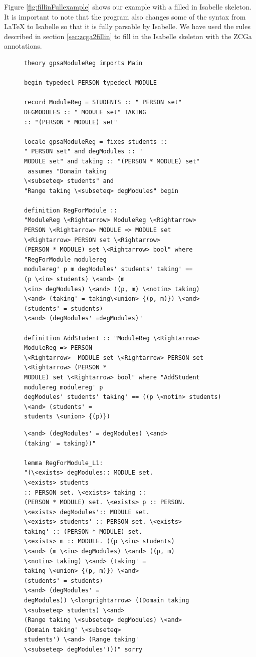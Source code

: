 Figure \ref{fig:fillinFullexample} shows our example with a filled in Isabelle
skeleton. It is important to note that the program also changes some of the
syntax from \LaTeX{} to Isabelle so that it is fully parsable by Isabelle.
We have used the rules described in section \ref{sec:zcga2fillin} to fill in the Isabelle
 skeleton with the ZCGa annotations.

\begin{figure}[H]
\centering
\begin{minipage}{0.45\textwidth}
\centering
\begin{scriptsize}
\begin{BVerbatim}
theory gpsaModuleReg imports Main 

begin typedecl PERSON typedecl MODULE

record ModuleReg = STUDENTS :: " PERSON set"
DEGMODULES :: " MODULE set" TAKING
:: "(PERSON * MODULE) set"

locale gpsaModuleReg = fixes students :: 
" PERSON set" and degModules :: "
MODULE set" and taking :: "(PERSON * MODULE) set"
 assumes "Domain taking
\<subseteq> students" and 
"Range taking \<subseteq> degModules" begin

definition RegForModule :: 
"ModuleReg \<Rightarrow> ModuleReg \<Rightarrow>
PERSON \<Rightarrow> MODULE => MODULE set 
\<Rightarrow> PERSON set \<Rightarrow>
(PERSON * MODULE) set \<Rightarrow> bool" where 
"RegForModule modulereg
modulereg' p m degModules' students' taking' == 
(p \<in> students) \<and> (m
\<in> degModules) \<and> ((p, m) \<notin> taking) 
\<and> (taking' = taking\<union> {(p, m)}) \<and> 
(students' = students) 
\<and> (degModules' =degModules)"

definition AddStudent :: "ModuleReg \<Rightarrow> 
ModuleReg => PERSON
\<Rightarrow>  MODULE set \<Rightarrow> PERSON set 
\<Rightarrow> (PERSON *
MODULE) set \<Rightarrow> bool" where "AddStudent 
modulereg modulereg' p
degModules' students' taking' == ((p \<notin> students) 
\<and> (students' =
students \<union> {(p)}) 
\end{BVerbatim}
\end{scriptsize}
\end{minipage}\hfill
\begin{minipage}{0.45\textwidth}
\begin{scriptsize}
\begin{BVerbatim}
\<and> (degModules' = degModules) \<and> 
(taking' = taking))"

lemma RegForModule_L1: 
"(\<exists> degModules:: MODULE set. 
\<exists> students
:: PERSON set. \<exists> taking :: 
(PERSON * MODULE) set. \<exists> p :: PERSON.
\<exists> degModules':: MODULE set. 
\<exists> students' :: PERSON set. \<exists>
taking' :: (PERSON * MODULE) set. 
\<exists> m :: MODULE. ((p \<in> students)
\<and> (m \<in> degModules) \<and> ((p, m) 
\<notin> taking) \<and> (taking' =
taking \<union> {(p, m)}) \<and> 
(students' = students) 
\<and> (degModules' =
degModules)) \<longrightarrow> ((Domain taking 
\<subseteq> students) \<and>
(Range taking \<subseteq> degModules) \<and> 
(Domain taking' \<subseteq>
students') \<and> (Range taking' 
\<subseteq> degModules')))" sorry


\end{BVerbatim}
\end{scriptsize}
\end{minipage}
\end{figure}
